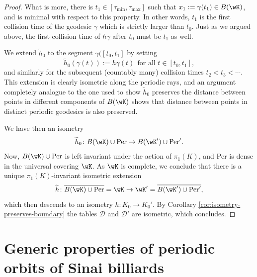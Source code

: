 \documentclass[reqno,11pt]{amsart}
\begin{document}
\begin{proof}
What is more, there is \(t_1 \in [\tau_{\mathrm{min}}, \tau_{\mathrm{max}}]\) such that \(x_1:= \gamma(t_1) \in B(\wK)\), and is minimal with respect to this property. 
In other words, \(t_1\) is the first collision time of the geodesic \(\gamma\) which is strictly larger than \(t_0\).
Just as we argued above, the first collision time of \(h\gamma\) after \(t_0\) must be \(t_1\) as well.
\par We extend \(\widetilde{h}_0\) to the segment \(\gamma([t_0, t_1]\) by setting 
\[
    \widetilde{h}_0(\gamma(t)) := h\gamma(t) \ \ \text{for all } t \in [t_0, t_1],
\]
and similarly for the subsequent (countably many) collision times \(t_2 < t_3 < \cdots \).
This extension is clearly isometric along the periodic rays, and an argument completely analogue to the one used to show \(\widetilde{h}_0\) preserves the distance between points in different components of \(B(\wK)\) shows that distance between points in distinct periodic geodesics is also preserved.
\par We have then an isometry
\[
    \widetilde{h}_0\colon B(\wK) \cup \mathrm{Per} \to B(\wK') \cup \mathrm{Per'}.
\]
Now, \(B(\wK) \cup \mathrm{Per}\) is left invariant under the action of \(\pi_1(K)\), and 
\(\mathrm{Per}\) is dense in the universal covering \(\wK\).
As \(\wK\) is complete, we conclude that there is a unique \(\pi_1(K)\)-invariant isometric extension
\[
    \widetilde h \colon \overline{B(\wK) \cup \mathrm{Per}} = \wK \to \wK'= \overline{B(\wK') \cup \mathrm{Per}'},
\]
which then descends to an isometry \(h\colon K_0 \to K_0'\). 
By Corollary \ref{cor:isometry-preserves-boundary} the tables \(\mathcal{D}\) and \(\mathcal{D}'\) are isometric, which concludes.\qedhere

\end{proof}





\appendix

\section{Generic properties of periodic orbits of Sinai billiards}\label{sec_periodicorbitsbilliard}
\end{document}
